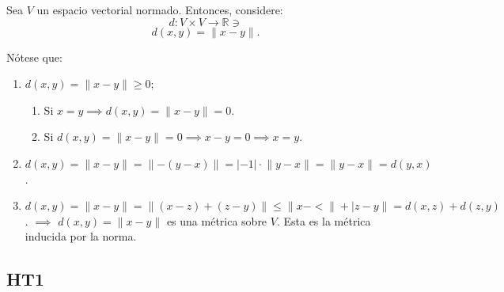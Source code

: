 \begin{nota}
	Sea $V$ un espacio vectorial normado. Entonces, considere: 
	$$d:V\times V \to \mathbb{R}\ni$$
	$$d(x,y)=\lVert x-y \rVert.$$
	
	Nótese que: 
	
	\begin{enumerate}
		\item $d(x,y)=\lVert x-y\rVert \geq 0$; 
		\begin{enumerate}
			\item Si $x=y\implies d(x,y)=\lVert x-y\rVert =0$. 
\item Si $d(x,y)=\lVert x-y \rVert =0 \implies x-y=0 \implies x=y$.		
			\end{enumerate}
		
		\item $d(x,y)=\lVert x-y \rVert = \lVert -(y-x)\rVert = |-1|\cdot \lVert y-x\rVert = \lVert y-x\rVert = d(y,x)$. 
		\item $d(x,y)= \lVert x-y\rVert = \lVert (x-z)+(z-y)\rVert \leq \lVert x-<\rVert + \lvert z-y \rVert = d(x,z)+d(z,y)$. $\implies$ $d(x,y)=\lVert x-y\rVert$ es una métrica sobre $V$. Esta es la métrica inducida por la norma.
	\end{enumerate}
\end{nota}

\subsection{HT1}


